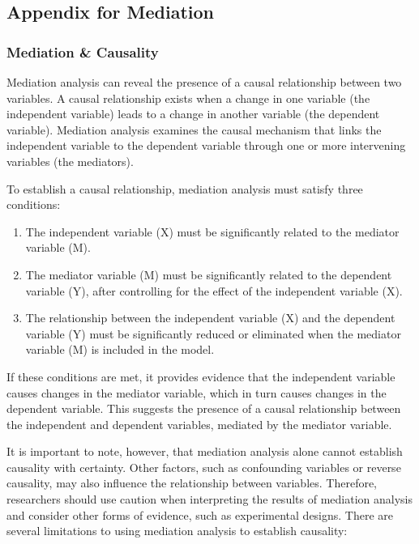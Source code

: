 \documentclass[
]{ctexart}
\begin{document}
\hypertarget{appendix-for-mediation}{%
\subsection{Appendix for Mediation}\label{appendix-for-mediation}}

\hypertarget{mediation-causality}{%
\subsubsection{Mediation \& Causality}\label{mediation-causality}}

Mediation analysis can reveal the presence of a causal relationship
between two variables. A causal relationship exists when a change in one
variable (the independent variable) leads to a change in another
variable (the dependent variable). Mediation analysis examines the
causal mechanism that links the independent variable to the dependent
variable through one or more intervening variables (the mediators).

To establish a causal relationship, mediation analysis must satisfy
three conditions:

\begin{enumerate}
\def\labelenumi{\arabic{enumi}.}
\item
  The independent variable (X) must be significantly related to the
  mediator variable (M).
\item
  The mediator variable (M) must be significantly related to the
  dependent variable (Y), after controlling for the effect of the
  independent variable (X).
\item
  The relationship between the independent variable (X) and the
  dependent variable (Y) must be significantly reduced or eliminated
  when the mediator variable (M) is included in the model.
\end{enumerate}

If these conditions are met, it provides evidence that the independent
variable causes changes in the mediator variable, which in turn causes
changes in the dependent variable. This suggests the presence of a
causal relationship between the independent and dependent variables,
mediated by the mediator variable.

It is important to note, however, that mediation analysis alone cannot
establish causality with certainty. Other factors, such as confounding
variables or reverse causality, may also influence the relationship
between variables. Therefore, researchers should use caution when
interpreting the results of mediation analysis and consider other forms
of evidence, such as experimental designs. There are several limitations
to using mediation analysis to establish causality:
\end{document}
